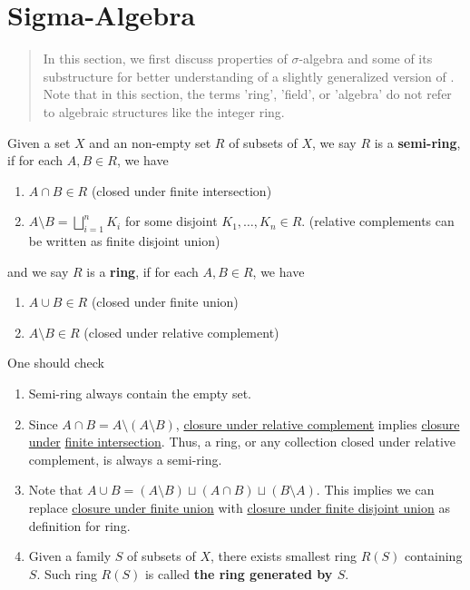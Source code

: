 \documentclass{report}
\begin{document}
\section{Sigma-Algebra} 
\begin{abstract}
In this section, we first discuss properties of $\sigma$-algebra and some of its substructure for better understanding of a slightly generalized version of . Note that in this section, the terms 'ring', 'field', or 'algebra' do not refer to algebraic structures like the integer ring. 
\end{abstract}
\begin{mdframed}
Given a set $X$ and an non-empty set $R$ of subsets of $X$, we say  $R$ is a \textbf{semi-ring}, if for each $A,B \in R$, we have 
\begin{enumerate}[label=(\alph*)]
  \item $A\cap B \in R$ (closed under finite intersection)
  \item  $A\setminus B=\bigsqcup_{i=1}^n K_i$ for some disjoint $K_1,\dots ,K_n \in R$. (relative complements can be written as finite disjoint union)
\end{enumerate}
and we say $R$ is a \textbf{ring}, if for each $A,B \in R$, we have 
\begin{enumerate}[label=(\alph*)]
  \item $A\cup B \in R$ (closed under finite union)
  \item $A\setminus  B \in R$ (closed under relative complement)
\end{enumerate}
One should check 
\begin{enumerate}[label=(\alph*)]
\label{c_ring}
  \item Semi-ring always contain the empty set.
\item Since $A\cap B=A\setminus (A\setminus B)$, \underline{closure under relative complement} implies \underline{closure under} \underline{finite intersection}. Thus, a ring, or any collection closed under relative complement, is always a semi-ring.
\item Note that $A\cup B=(A\setminus B)\sqcup (A\cap B) \sqcup  (B\setminus A)$. This implies we can replace  \underline{closure under finite union} with \underline{closure under finite disjoint union} as definition for ring. 
  \item Given a family $S$ of subsets of $X$, there exists smallest ring  $R(S)$ containing $S$. Such ring $R(S)$ is called \textbf{the ring generated by $S$}. 
\end{enumerate}
\end{mdframed}
\end{document}
